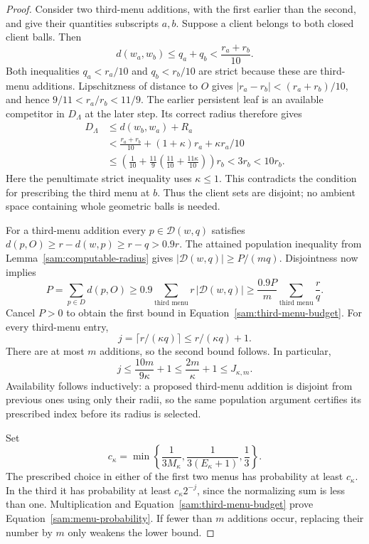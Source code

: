 \begin{proof}
Consider two third-menu additions, with the first earlier than the second,
and give their quantities subscripts $a,b$.  Suppose a client belongs to
both closed client balls.  Then
\[
 d(w_a,w_b)\le q_a+q_b<\frac{r_a+r_b}{10}.
\]
Both inequalities $q_a<r_a/10$ and $q_b<r_b/10$ are strict because these
are third-menu additions.  Lipschitzness of distance to $O$ gives
$|r_a-r_b|<(r_a+r_b)/10$, and hence
$9/11<r_a/r_b<11/9$.  The earlier persistent leaf is an available
competitor in $D_\Lambda$ at the later step.  Its correct radius therefore
gives
\begin{align*}
 D_\Lambda
 &\le d(w_b,w_a)+R_a\\
 &<\frac{r_a+r_b}{10}+(1+\kappa)r_a+\kappa r_a/10\\
 &\le\left(\frac1{10}+
       \frac{11}{9}\left(\frac{11}{10}+\frac{11\kappa}{10}\right)
       \right)r_b
 <3r_b<10r_b.
\end{align*}
Here the penultimate strict inequality uses $\kappa\le1$.
This contradicts the condition for prescribing the third menu at $b$.
Thus the client sets are disjoint; no ambient space containing whole
geometric balls is needed.

For a third-menu addition every $p\in\mathcal D(w,q)$ satisfies
$d(p,O)\ge r-d(w,p)\ge r-q>0.9r$.  The attained population inequality
from Lemma~\ref{sam:computable-radius} gives
$|\mathcal D(w,q)|\ge P/(mq)$.  Disjointness now implies
\[
 P=\sum_{p\in D}d(p,O)
 \ge0.9\sum_{\text{third menu}}r\,|\mathcal D(w,q)|
 \ge\frac{0.9P}{m}\sum_{\text{third menu}}\frac rq.
\]
Cancel $P>0$ to obtain the first bound in
Equation~\eqref{sam:third-menu-budget}.  For every third-menu entry,
\[
 j=\lceil r/(\kappa q)\rceil\le r/(\kappa q)+1.
\]
There are at most $m$ additions, so the second bound follows.
In particular,
\[
 j\le\frac{10m}{9\kappa}+1\le\frac{2m}{\kappa}+1\le J_{\kappa,m}.
\]
Availability follows inductively: a proposed third-menu addition is
disjoint from previous ones using only their radii, so the same population
argument certifies its prescribed index before its radius is selected.

Set
\[
 c_\kappa=\min\left\{\frac1{3M_\kappa},
                  \frac1{3(E_\kappa+1)},\frac13\right\}.
\]
The prescribed choice in either of the first two menus has probability
at least $c_\kappa$.  In the third it has probability at least
$c_\kappa2^{-j}$, since the normalizing sum is less than one.
Multiplication and Equation~\eqref{sam:third-menu-budget} prove
Equation~\eqref{sam:menu-probability}.  If fewer than $m$ additions occur,
replacing their number by $m$ only weakens the lower bound.
\end{proof}

